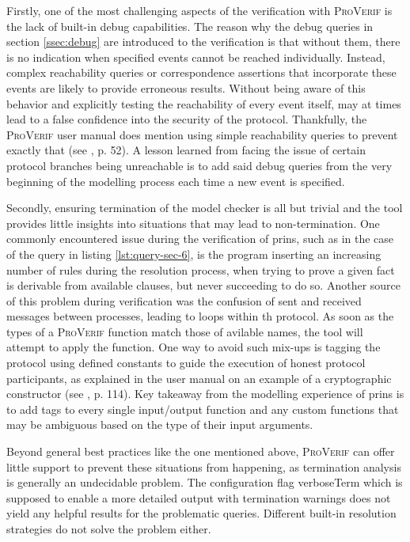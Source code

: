 Firstly, one of the most challenging aspects of the verification with \textsc{ProVerif} is the lack of built-in debug capabilities.
The reason why the debug queries in section \ref{ssec:debug} are introduced to the verification is that without them, there is no indication when specified events cannot be reached individually.
Instead, complex reachability queries or correspondence assertions that incorporate these events are likely to provide erroneous results.
Without being aware of this behavior and explicitly testing the reachability of every event itself, may at times lead to a false confidence into the security of the protocol.
Thankfully, the \textsc{ProVerif} user manual does mention using simple reachability queries to prevent exactly that (see \cite{blanchet2020proverif}, p. 52).
A lesson learned from facing the issue of certain protocol branches being unreachable is to add said debug queries from the very beginning of the modelling process each time a new event is specified.\medskip

Secondly, ensuring termination of the model checker is all but trivial and the tool provides little insights into situations that may lead to non-termination.
One commonly encountered issue during the verification of \gls{prins}, such as in the case of the query in listing \ref{lst:query-sec-6}, is the program inserting an increasing number of rules during the resolution process, when trying to prove a given fact is derivable from available clauses, but never succeeding to do so.
Another source of this problem during verification was the confusion of sent and received messages between processes, leading to loops within th protocol.
As soon as the types of a \textsc{ProVerif} function match those of avilable names, the tool will attempt to apply the function.
One way to avoid such mix-ups is tagging the protocol using defined constants to guide the execution of honest protocol participants, as explained in the user manual on an example of a cryptographic constructor (see \cite{blanchet2020proverif}, p. 114).
Key takeaway from the modelling experience of \gls{prins} is to add tags to every single input/output function and any custom functions that may be ambiguous based on the type of their input arguments.

Beyond general best practices like the one mentioned above, \textsc{ProVerif} can offer little support to prevent these situations from happening, as termination analysis is generally an undecidable problem.
The configuration flag {\sffamily verboseTerm} which is supposed to enable a more detailed output with termination warnings does not yield any helpful results for the problematic queries.
Different built-in resolution strategies do not solve the problem either.\medskip

